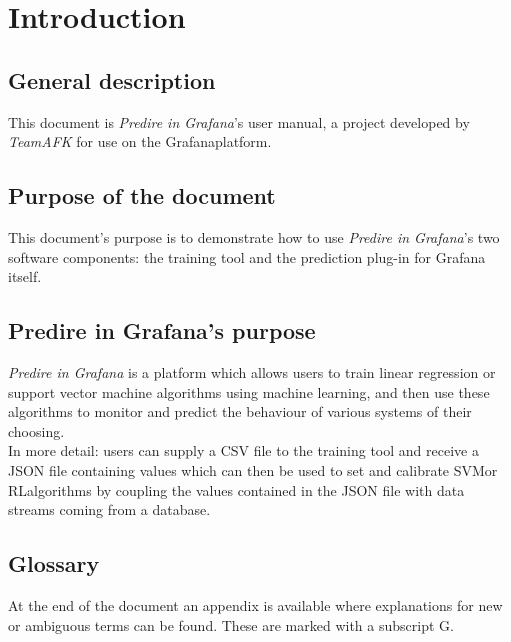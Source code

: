 \section{Introduction}

\subsection{General description}
This document is \textit{Predire in Grafana}’s user manual, a project developed by \textit{TeamAFK} for use on the Grafana\glo platform.

\subsection{Purpose of the document}
This document’s purpose is to demonstrate how to use \textit{Predire in Grafana}’s two software components: the training tool and the prediction plug-in for Grafana itself.

\subsection{Predire in Grafana’s purpose}
\textit{Predire in Grafana} is a platform which allows users to train linear regression or support vector machine algorithms using machine learning\glo, and then use these algorithms to monitor and predict the behaviour of various systems of their choosing.\\
In more detail:	
users can supply a CSV file to the training tool and receive a JSON file containing values which can then be used to set and calibrate SVM\glo or RL\glo algorithms by coupling the values contained in the JSON file with data streams coming from a database.

\subsection{Glossary}
At the end of the document an appendix is available where explanations for new or ambiguous terms can be found. These are marked with a subscript G.

